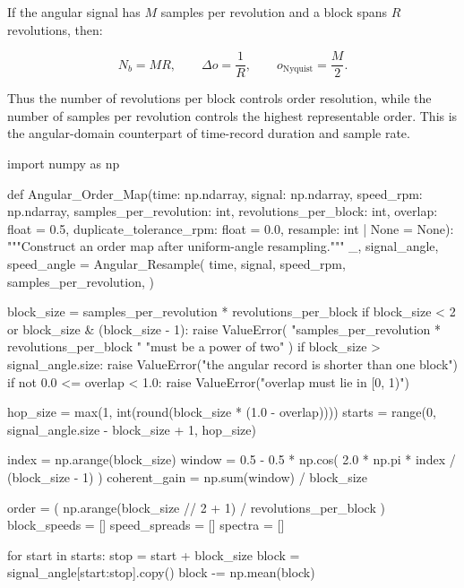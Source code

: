 If the angular signal has $ M $ samples per revolution and a block spans $ R $
revolutions, then:

\begin{equation}
    N_b=MR,
    \qquad
    \Delta o=\frac{1}{R},
    \qquad
    o_{\mathrm{Nyquist}}=\frac{M}{2}.
\end{equation}

Thus the number of revolutions per block controls order resolution, while the
number of samples per revolution controls the highest representable order. This
is the angular-domain counterpart of time-record duration and sample rate.

\begin{python}
import numpy as np


def Angular_Order_Map(time: np.ndarray,
                      signal: np.ndarray,
                      speed_rpm: np.ndarray,
                      samples_per_revolution: int,
                      revolutions_per_block: int,
                      overlap: float = 0.5,
                      duplicate_tolerance_rpm: float = 0.0,
                      resample: int | None = None):
    """Construct an order map after uniform-angle resampling."""
    _, signal_angle, speed_angle = Angular_Resample(
        time,
        signal,
        speed_rpm,
        samples_per_revolution,
    )

    block_size = samples_per_revolution * revolutions_per_block
    if block_size < 2 or block_size & (block_size - 1):
        raise ValueError(
            "samples_per_revolution * revolutions_per_block "
            "must be a power of two"
        )
    if block_size > signal_angle.size:
        raise ValueError("the angular record is shorter than one block")
    if not 0.0 <= overlap < 1.0:
        raise ValueError("overlap must lie in [0, 1)")

    hop_size = max(1, int(round(block_size * (1.0 - overlap))))
    starts = range(0, signal_angle.size - block_size + 1, hop_size)

    index = np.arange(block_size)
    window = 0.5 - 0.5 * np.cos(
        2.0 * np.pi * index / (block_size - 1)
    )
    coherent_gain = np.sum(window) / block_size

    order = (
        np.arange(block_size // 2 + 1)
        / revolutions_per_block
    )
    block_speeds = []
    speed_spreads = []
    spectra = []

    for start in starts:
        stop = start + block_size
        block = signal_angle[start:stop].copy()
        block -= np.mean(block)


\end{python}
